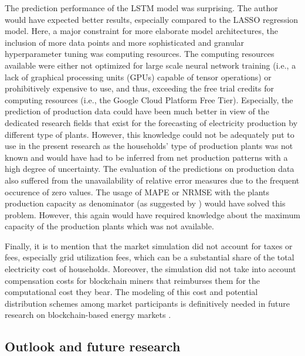The prediction performance of the LSTM model was surprising. The author would have expected better results, especially compared to the LASSO regression model. Here, a major constraint for more elaborate model architectures, the inclusion of more data points and more sophisticated and granular hyperparameter tuning was computing resources. The computing resources available were either not optimized for large scale neural network training (i.e., a lack of graphical processing units (GPUs) capable of tensor operations) or prohibitively expensive to use, and thus, exceeding the free trial credits for computing resources (i.e., the Google Cloud Platform Free Tier). Especially, the prediction of production data could have been much better in view of the dedicated research fields that exist for the forecasting of electricity production by different type of plants. However, this knowledge could not be adequately put to use in the present research as the households' type of production plants was not known and would have had to be inferred from net production patterns with a high degree of uncertainty. The evaluation of the predictions on production data also suffered from the unavailability of relative error measures due to the frequent occurence of zero values. The usage of MAPE or NRMSE with the plants production capacity as denominator (as suggested by \citet{Hoff:2013}) would have solved this problem. However, this again would have required knowledge about the maximum capacity of the production plants which was not available.

Finally, it is to mention that the market simulation did not account for taxes or fees, especially grid utilization fees, which can be a substantial share of the total electricity cost of households. Moreover, the simulation did not take into account compensation costs for blockchain miners that reimburses them for the computational cost they bear. The modeling of this cost and potential distribution schemes among market participants is definitively needed in future research on blockchain-based energy markets \citep[see also][]{Mengelkamp:2018a}.




\subsection{Outlook and future research}\label{Sec:Conclusion;Subsec:Outlook}

